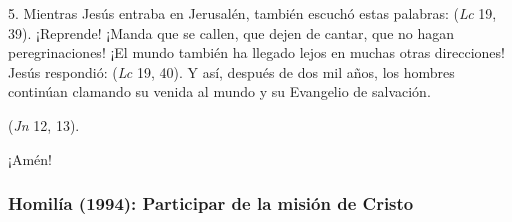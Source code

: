 \begin{body}
5. Mientras Jesús entraba en Jerusalén, también escuchó estas palabras:  (\textit{Lc} 19, 39). ¡Reprende! ¡Manda que se callen, que dejen de cantar, que no hagan peregrinaciones! ¡El mundo también ha llegado lejos en muchas otras direcciones! Jesús respondió:  (\textit{Lc} 19, 40). Y así, después de dos mil años, los hombres continúan clamando su venida al mundo y su Evangelio de salvación.

 (\textit{Jn} 12, 13).

¡Amén!
\end{body}

\label{b2-04-01-1991H}


\newpage

\subsubsection{Homilía (1994): Participar de la misión de Cristo}


